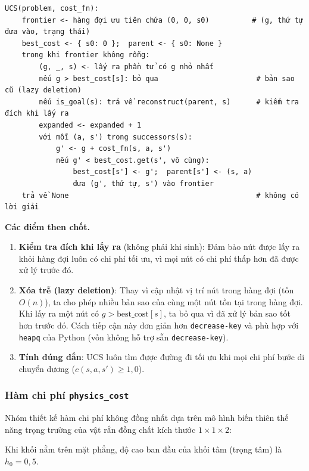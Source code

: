 \begin{Verbatim}[breaklines=true, fontsize=\footnotesize, frame=single]
UCS(problem, cost_fn):
    frontier <- hàng đợi ưu tiên chứa (0, 0, s0)          # (g, thứ tự đưa vào, trạng thái)
    best_cost <- { s0: 0 };  parent <- { s0: None }
    trong khi frontier không rỗng:
        (g, _, s) <- lấy ra phần tử có g nhỏ nhất
        nếu g > best_cost[s]: bỏ qua                       # bản sao cũ (lazy deletion)
        nếu is_goal(s): trả về reconstruct(parent, s)      # kiểm tra đích khi lấy ra
        expanded <- expanded + 1
        với mỗi (a, s') trong successors(s):
            g' <- g + cost_fn(s, a, s')
            nếu g' < best_cost.get(s', vô cùng):
                best_cost[s'] <- g';  parent[s'] <- (s, a)
                đưa (g', thứ tự, s') vào frontier
    trả về None                                            # không có lời giải
\end{Verbatim}

\textbf{Các điểm then chốt.}

\begin{enumerate}
\item \textbf{Kiểm tra đích khi lấy ra} (không phải khi sinh): Đảm bảo nút được lấy ra khỏi hàng đợi luôn có chi phí tối ưu, vì mọi nút có chi phí thấp hơn đã được xử lý trước đó.
\item \textbf{Xóa trễ (lazy deletion)}: Thay vì cập nhật vị trí nút trong hàng đợi (tốn $O(n)$), ta cho phép nhiều bản sao của cùng một nút tồn tại trong hàng đợi. Khi lấy ra một nút có $g > \text{best\_cost}[s]$, ta bỏ qua vì đã xử lý bản sao tốt hơn trước đó. Cách tiếp cận này đơn giản hơn \texttt{decrease-key} và phù hợp với \texttt{heapq} của Python (vốn không hỗ trợ sẵn \texttt{decrease-key}).
\item \textbf{Tính đúng đắn}: UCS luôn tìm được đường đi tối ưu khi mọi chi phí bước di chuyển dương ($c(s, a, s') \ge 1{,}0$).
\end{enumerate}

\subsubsection{Hàm chi phí \texttt{physics\_\allowbreak{}cost}}

Nhóm thiết kế hàm chi phí không đồng nhất dựa trên mô hình biến thiên thế năng trọng trường của vật rắn đồng chất kích thước $1 \times 1 \times 2$:

Khi khối nằm trên mặt phẳng, độ cao ban đầu của khối tâm (trọng tâm) là $h_0 = 0{,}5$.

